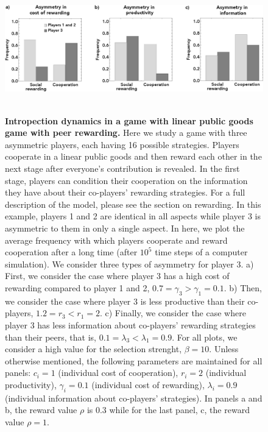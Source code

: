 \documentclass[11pt]{article}
\theoremstyle{plainCl1}
\theoremstyle{plainCl2}
\begin{document}
\clearpage
\begin{figure}
\centering
\includegraphics[width =  \textwidth]{figures/figure4.eps}~\\[0.4cm]
\caption{\onehalfspacing
\textbf{Intropection dynamics in a game with linear public goods game with peer rewarding.} Here we study a game with three asymmetric players, each having 16 possible strategies. Players cooperate in a linear public goods and then reward each other in the next stage after everyone's contribution is revealed. In the first stage, players can condition their cooperation on the information they have about their co-players' rewarding strategies. For a full description of the model, please see the section on rewarding. In this example, players 1 and 2 are identical in all aspects while player 3 is asymmetric to them in only a single aspect. In here, we plot the average frequency with which players cooperate and reward cooperation after a long time (after $10^5$ time steps of a computer simulation). We consider three types of asymmetry for player 3. a) First, we consider the case where player 3 has a high cost of rewarding compared to player 1 and 2, $0.7 = \gamma_3 > \gamma_1 = 0.1$. b) Then, we consider the case where player 3 is less productive than their co-players, $1.2 = r_3 < r_1 = 2$. c) Finally, we consider the case where player 3 has less information about co-players' rewarding strategies than their peers, that is, $0.1 = \lambda_3 < \lambda_1 = 0.9$. For all plots, we consider a high value for the selection strenght, $\beta = 10$. Unless otherwise mentioned, the following parameters are maintained for all panels: $c_i = 1$ (individual cost of cooperation), $r_i = 2$ (individual productivity), $\gamma_i = 0.1$ (individual cost of rewarding), $\lambda_i = 0.9$ (individual information about co-players' strategies). In panels a and b, the reward value $\rho$ is 0.3 while for the last panel, c, the reward value $\rho = 1$.}
\label{Fig:SocialRewarding}
\end{figure}

\clearpage

\newpage

\end{document}
